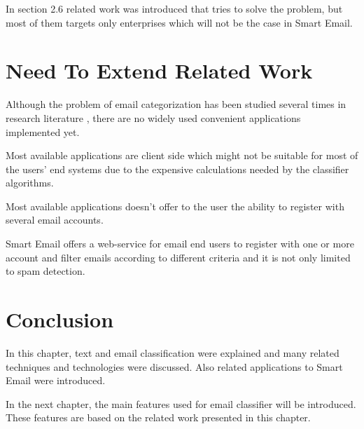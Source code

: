 In section 2.6 related work was introduced that tries to solve the problem, but most of them targets only enterprises which will not be the case in Smart Email.

\section{Need To Extend Related Work}
\begin{my_itemize}
    \item Although the problem of email categorization has been studied several
    times in research literature , there are no widely used convenient
    applications implemented yet.
    \item Most available applications are client side which might not be
    suitable for most of the users' end systems due to the expensive calculations
    needed by the classifier algorithms.
    \item Most available applications doesn't offer to the user the ability to 
    register with several email accounts.
    \item Smart Email offers a web-service for email end users to register with
    one or more account and filter emails according to different criteria and
    it is not only limited to spam detection.
\end{my_itemize}

\section{Conclusion}
In this chapter, text and email classification were explained and many related techniques and technologies were discussed. Also related applications to Smart Email were introduced.

In the next chapter, the main features used for email classifier will be introduced. These features are based on the related work presented in this chapter.
